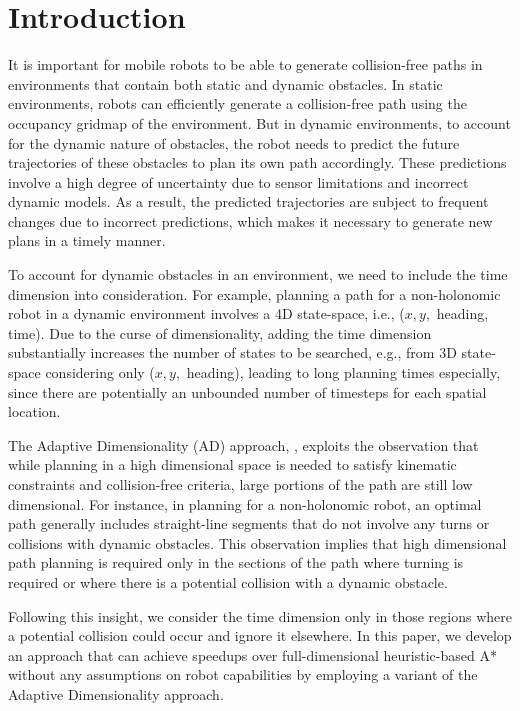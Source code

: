 
\section{Introduction}
\label{sec:introduction}

It is important for mobile robots to be able to generate collision-free paths in environments that contain both static and dynamic obstacles.
In static environments, robots can efficiently generate a collision-free path using the occupancy gridmap of the environment. But in dynamic environments, to account for the dynamic nature of obstacles, the robot needs to predict the future trajectories of these obstacles to plan its own path accordingly. These predictions involve a high degree of uncertainty due to sensor limitations and incorrect dynamic models. As a result, the predicted trajectories are subject to frequent changes due to incorrect predictions, which makes it necessary to generate new plans in a timely manner.

To account for dynamic obstacles in an environment, we need to include the time dimension into consideration. 
For example, planning a path for a non-holonomic robot in a dynamic environment involves a 4D state-space, i.e., ($x, y,$ heading, time). 
Due to the curse of dimensionality, adding the time dimension substantially increases the number of states to be searched, e.g., from 3D state-space considering only ($x, y,$ heading), leading to long planning times especially, since there are potentially an unbounded number of timesteps for each spatial location.  


The Adaptive Dimensionality (AD) approach, \cite{gochev2011path}, exploits the observation that while planning in a high dimensional space is needed to satisfy kinematic constraints and collision-free criteria, large portions of the path are still low dimensional. For instance, in planning for a non-holonomic robot, an optimal path generally includes straight-line segments that do not involve any turns or collisions with dynamic obstacles. This observation implies that high dimensional path planning is required only in the sections of the path where turning is required or where there is a potential collision with a dynamic obstacle. 

Following this insight, we consider the time dimension only in those regions where a potential collision could occur and ignore it elsewhere. In this paper, we develop an approach that can achieve speedups over full-dimensional heuristic-based A* without any assumptions on robot capabilities by employing a variant of the Adaptive Dimensionality approach.

